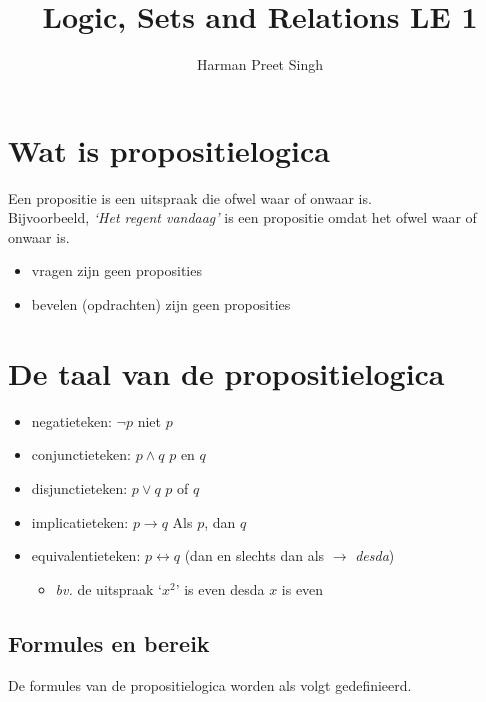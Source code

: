 \documentclass[a4paper, 12pt]{article}
\title{Logic, Sets and Relations \textemdash{} LE 1}
\author{Harman Preet Singh}
\begin{document}

\maketitle
\tableofcontents

\section{Wat is propositielogica}
Een propositie is een uitspraak die ofwel waar of onwaar is.\\
Bijvoorbeeld, \textit{`Het regent vandaag'} is een propositie omdat het ofwel waar of onwaar is.

\begin{itemize}
	\item vragen zijn geen proposities
	\item bevelen (opdrachten) zijn geen proposities
\end{itemize}





\section{De taal van de propositielogica}

\begin{itemize}
	\item negatie\-teken: $\neg p$ \hfill niet $p$
	\item conjunctie\-teken: $p \land q$ \hfill $p$ en $q$
	\item disjunctie\-teken: $p \lor q$ \hfill $p$ of $q$
	\item implicatie\-teken: $p \rightarrow q$ \hfill Als $p$, dan $q$
	\item equivalentie\-teken: $p \leftrightarrow q$ \hfill (dan en slechts dan als $\rightarrow$ \textit{desda})
	\begin{itemize}
		\item \textit{bv.} de uitspraak `$x^2$' is even desda $x$ is even
	\end{itemize}
\end{itemize}




\subsection{Formules en bereik}
De formules van de propositielogica worden als volgt gedefinieerd.
\end{document}
